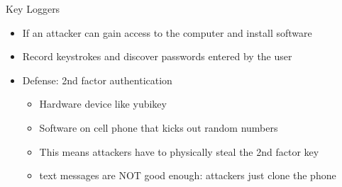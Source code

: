 \begin{withoutheadline}
\begin{frame}{Key Loggers}
\begin{itemize}
    \item If an attacker can gain access to the computer and install software
    \item Record keystrokes and discover passwords entered by the user
    \item Defense: 2nd factor authentication
    \begin{itemize}
        \item Hardware device like yubikey
        \item Software on cell phone that kicks out random numbers
        \item This means attackers have to physically steal the 2nd factor key
        \item text messages are NOT good enough: attackers just clone the phone
    \end{itemize}
\end{itemize}
\end{frame}





\end{withoutheadline}
 
